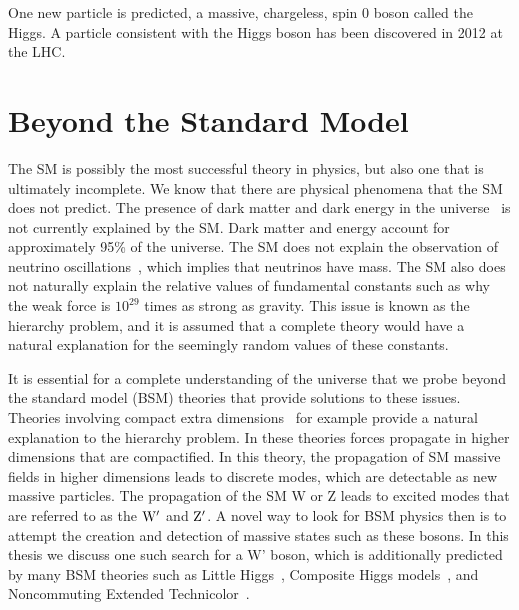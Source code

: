 One new particle is predicted, a massive, chargeless, spin 0 boson called the Higgs.  
A particle consistent with the Higgs boson has been discovered in 2012 at the LHC.  

  
\section{Beyond the Standard Model}
\label{sec:BSMtheory}
The SM is possibly the most successful theory in physics, but also one that is ultimately incomplete.  
We know that there are physical phenomena that the SM does not predict.  
The presence of dark matter and dark energy in the universe~\cite{Bennett:2003ba} is not currently explained by the SM.  
Dark matter and energy account for approximately 95\% of the universe.  
The SM does not explain the observation of neutrino oscillations~\cite{An:2012eh}, which implies that neutrinos have mass.  
The SM also does not naturally explain the relative values of fundamental constants such as why the weak force is $10^{29}$ times as strong as gravity.  
This issue is known as the hierarchy problem, and it is assumed that a complete theory would have a natural explanation for the seemingly random values of these constants.  

It is essential for a complete understanding of the universe that we probe beyond the standard model (BSM) theories that provide solutions to these issues.  
Theories involving compact extra dimensions~\cite{PhysRevD.64.035002} for example provide a natural explanation to the hierarchy problem.  
In these theories forces propagate in higher dimensions that are compactified.   
In this theory, the propagation of SM massive fields in higher dimensions leads to discrete modes, which are detectable as new massive particles.  
The propagation of the SM W or Z leads to excited modes that are referred to as the $\mathrm{W}^{\prime}$ and $\mathrm{Z}^{\prime}$.
A novel way to look for BSM physics then is to attempt the creation and detection of massive states such as these bosons. 
In this thesis we discuss one such search for a W' boson, which is additionally predicted by many BSM theories such as Little Higgs~\cite{doi:10.1146/annurev.nucl.55.090704.151502}, 
Composite Higgs models~\cite{Vecchi:2013bja}, and Noncommuting Extended Technicolor~\cite{Chivukula:1995gu}.  



